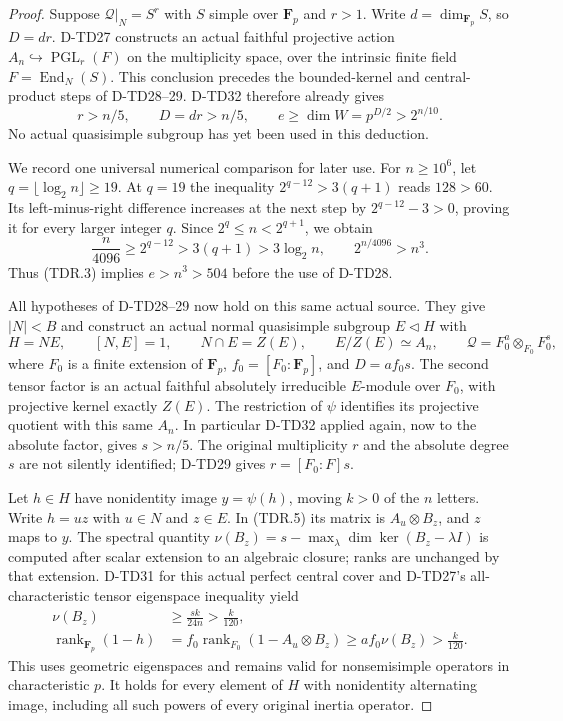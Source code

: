 \begin{proof}
Suppose $\mathcal Q|_N=S^r$ with $S$ simple over $\mathbf F_p$
and $r>1$. Write $d=\dim_{\mathbf F_p}S$, so $D=dr$.
D-TD27 constructs an actual faithful projective action
$A_n\hookrightarrow\operatorname{PGL}_r(F)$ on the multiplicity
space, over the intrinsic finite field $F=\operatorname{End}_N(S)$.
This conclusion precedes the bounded-kernel and central-product
steps of D-TD28--29. D-TD32 therefore already gives
\[
                  r>n/5,\qquad D=dr>n/5,\qquad
                  e\ge\dim W=p^{D/2}>2^{n/10}.
 \tag{TDR.3}
\]
No actual quasisimple subgroup has yet been used in this deduction.

We record one universal numerical comparison for later use.
For $n\ge10^6$, let $q=\lfloor\log_2 n\rfloor\ge19$.
At $q=19$ the inequality $2^{q-12}>3(q+1)$ reads $128>60$.
Its left-minus-right difference increases at the next step by
$2^{q-12}-3>0$, proving it for every larger integer $q$.
Since $2^q\le n<2^{q+1}$, we obtain
\[
       \frac{n}{4096}\ge2^{q-12}>3(q+1)>3\log_2 n,
       \qquad 2^{n/4096}>n^3.
 \tag{TDR.4}
\]
Thus (TDR.3) implies $e>n^3>504$ before the use of D-TD28.

All hypotheses of D-TD28--29 now hold on this same actual source.
They give $|N|<B$ and construct an actual normal quasisimple
subgroup $E\triangleleft H$ with
\[
 H=NE,\qquad [N,E]=1,\qquad N\cap E=Z(E),\qquad
 E/Z(E)\simeq A_n,
 \qquad
 \mathcal Q=F_0^a\otimes_{F_0}F_0^s,
 \tag{TDR.5}
\]
where $F_0$ is a finite extension of $\mathbf F_p$,
$f_0=[F_0:\mathbf F_p]$, and $D=af_0s$.
The second tensor factor is an actual faithful absolutely
irreducible $E$-module over $F_0$, with projective kernel exactly
$Z(E)$. The restriction of $\psi$ identifies its projective
quotient with this same $A_n$. In particular D-TD32 applied again,
now to the absolute factor, gives $s>n/5$.
The original multiplicity $r$ and the absolute degree $s$ are
not silently identified; D-TD29 gives $r=[F_0:F]s$.

Let $h\in H$ have nonidentity image $y=\psi(h)$, moving $k>0$
of the $n$ letters. Write $h=uz$ with $u\in N$ and $z\in E$.
In (TDR.5) its matrix is $A_u\otimes B_z$, and $z$ maps to $y$.
The spectral quantity
$\nu(B_z)=s-\max_\lambda\dim\ker(B_z-\lambda I)$ is computed
after scalar extension to an algebraic closure; ranks are unchanged
by that extension. D-TD31 for this actual perfect central cover
and D-TD27's all-characteristic tensor eigenspace inequality yield
\[
 \begin{split}
 \nu(B_z)&\ge\frac{s k}{24n}>\frac{k}{120},\\
 \operatorname{rank}_{\mathbf F_p}(1-h)
    &=f_0\operatorname{rank}_{F_0}(1-A_u\otimes B_z)
      \ge af_0\nu(B_z)>\frac{k}{120}.
 \end{split}
 \tag{TDR.6}
\]
This uses geometric eigenspaces and remains valid for nonsemisimple
operators in characteristic $p$. It holds for every element of $H$
with nonidentity alternating image, including all such powers of
every original inertia operator.


\end{proof}
